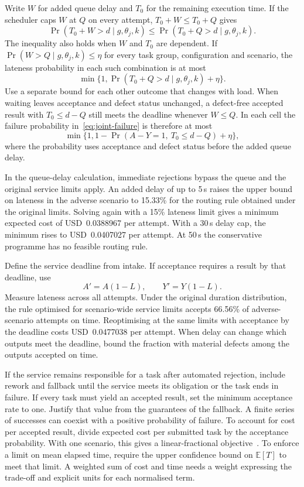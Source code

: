 \documentclass[11pt,reqno]{amsart}
\theoremstyle{definition}
\theoremstyle{remark}
\newcommand{\E}{\mathbb E}
\begin{document}
Write $W$ for added queue delay and $T_0$ for the remaining execution time.
If the scheduler caps $W$ at $Q$ on every attempt, $T_0+W\le T_0+Q$ gives
\[
 \Pr(T_0+W>d\mid g,\theta_j,k)
 \le \Pr(T_0+Q>d\mid g,\theta_j,k).
\]
The inequality also holds when $W$ and $T_0$ are dependent.
If $\Pr(W>Q\mid g,\theta_j,k)\le\eta$ for every task group, configuration and scenario, the lateness probability in each such combination is at most
\[
 \min\{1,\Pr(T_0+Q>d\mid g,\theta_j,k)+\eta\}.
\]
Use a separate bound for each other outcome that changes with load.
When waiting leaves acceptance and defect status unchanged, a defect-free accepted result with $T_0\le d-Q$ still meets the deadline whenever $W\le Q$. In each cell the failure probability in~\eqref{eq:joint-failure} is therefore at most
\[
 \min\{1,1-\Pr(A-Y=1,\ T_0\le d-Q)+\eta\},
\]
where the probability uses acceptance and defect status before the added queue delay.

In the queue-delay calculation, immediate rejections bypass the queue and the original service limits apply.
An added delay of up to 5\,s raises the upper bound on lateness in the adverse scenario to 15.33\% for the routing rule obtained under the original limits. Solving again with a 15\% lateness limit gives a minimum expected cost of USD~0.0388967 per attempt.
With a 30\,s delay cap, the minimum rises to USD~0.0407027 per attempt. At 50\,s the conservative programme has no feasible routing rule.

Define the service deadline from intake. If acceptance requires a result by that deadline, use
\[
 A'=A(1-L),\qquad Y'=Y(1-L).
\]
Measure lateness across all attempts.
Under the original duration distribution, the rule optimised for scenario-wide service limits accepts 66.56\% of adverse-scenario attempts on time.
Reoptimising at the same limits with acceptance by the deadline costs USD~0.0477038 per attempt.
When delay can change which outputs meet the deadline, bound the fraction with material defects among the outputs accepted on time.

If the service remains responsible for a task after automated rejection, include rework and fallback until the service meets its obligation or the task ends in failure.
If every task must yield an accepted result, set the minimum acceptance rate to one. Justify that value from the guarantees of the fallback. A finite series of successes can coexist with a positive probability of failure.
To account for cost per accepted result, divide expected cost per submitted task by the acceptance probability. With one scenario, this gives a linear-fractional objective~\cite{boyd}.
To enforce a limit on mean elapsed time, require the upper confidence bound on $\E[T]$ to meet that limit.
A weighted sum of cost and time needs a weight expressing the trade-off and explicit units for each normalised term.
\end{document}
